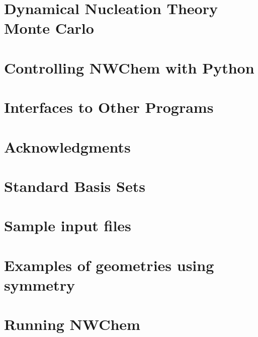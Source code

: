 \chapter{Dynamical Nucleation Theory Monte Carlo}


\chapter{Controlling NWChem with Python}


\chapter{Interfaces to Other Programs}


\clearpage
\chapter{Acknowledgments}

\clearpage

\appendix

\chapter{Standard Basis Sets}


\chapter{Sample input files}


\chapter{Examples of geometries using symmetry}


\chapter{Running NWChem}


